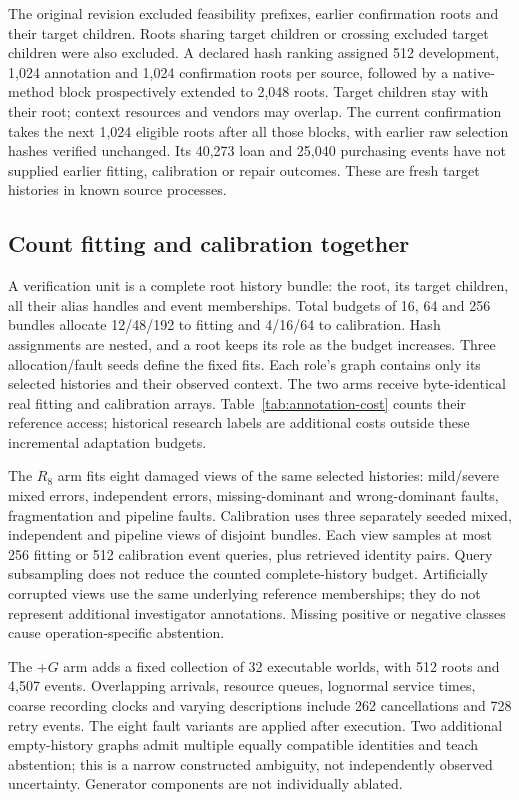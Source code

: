 \documentclass[11pt]{article}
\begin{document}
The original revision excluded feasibility prefixes, earlier confirmation roots and their target children. Roots sharing target children or crossing excluded target children were also excluded. A declared hash ranking assigned 512 development, 1,024 annotation and 1,024 confirmation roots per source, followed by a native-method block prospectively extended to 2,048 roots. Target children stay with their root; context resources and vendors may overlap. The current confirmation takes the next 1,024 eligible roots after all those blocks, with earlier raw selection hashes verified unchanged. Its 40,273 loan and 25,040 purchasing events have not supplied earlier fitting, calibration or repair outcomes. These are fresh target histories in known source processes.

\subsection{Count fitting and calibration together}
A verification unit is a complete root history bundle: the root, its target children, all their alias handles and event memberships. Total budgets of 16, 64 and 256 bundles allocate 12/48/192 to fitting and 4/16/64 to calibration. Hash assignments are nested, and a root keeps its role as the budget increases. Three allocation/fault seeds define the fixed fits. Each role's graph contains only its selected histories and their observed context. The two arms receive byte-identical real fitting and calibration arrays. Table~\ref{tab:annotation-cost} counts their reference access; historical research labels are additional costs outside these incremental adaptation budgets.


The $R_8$ arm fits eight damaged views of the same selected histories: mild/severe mixed errors, independent errors, missing-dominant and wrong-dominant faults, fragmentation and pipeline faults. Calibration uses three separately seeded mixed, independent and pipeline views of disjoint bundles. Each view samples at most 256 fitting or 512 calibration event queries, plus retrieved identity pairs. Query subsampling does not reduce the counted complete-history budget. Artificially corrupted views use the same underlying reference memberships; they do not represent additional investigator annotations. Missing positive or negative classes cause operation-specific abstention.

The $+G$ arm adds a fixed collection of 32 executable worlds, with 512 roots and 4,507 events. Overlapping arrivals, resource queues, lognormal service times, coarse recording clocks and varying descriptions include 262 cancellations and 728 retry events. The eight fault variants are applied after execution. Two additional empty-history graphs admit multiple equally compatible identities and teach abstention; this is a narrow constructed ambiguity, not independently observed uncertainty. Generator components are not individually ablated.
\end{document}
